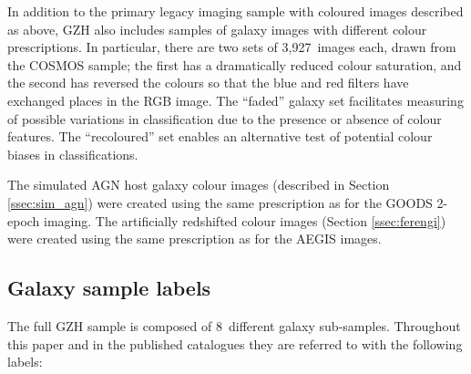 \documentclass[a4paper,fleqn,usenatbib]{mnras}
\begin{document}
In addition to the primary \hst{} legacy imaging sample with coloured images
described as above, GZH also includes samples of \hst{} galaxy images with
different colour prescriptions. In particular, there are two sets of 3,927~images
each, drawn from the COSMOS sample; the first has a dramatically reduced colour
saturation, and the second has reversed the colours so that the blue and red
filters have exchanged places in the RGB image. The ``faded'' galaxy set
facilitates measuring of possible variations in classification due to the
presence or absence of colour features. The ``recoloured'' set enables an
alternative test of potential colour biases in classifications.

The simulated AGN host galaxy colour images (described in Section \ref{ssec:sim_agn})
were created using the same prescription as for the GOODS 2-epoch imaging. The
artificially redshifted colour images (Section \ref{ssec:ferengi}) were created using the
same prescription as for the AEGIS images.


\subsection{Galaxy sample labels}\label{ssec:sample_labels}

The full GZH sample is composed of 8~different galaxy sub-samples. Throughout
this paper and in the published catalogues they are referred to with the
following labels:
\end{document}
